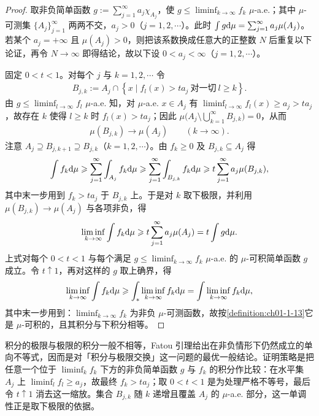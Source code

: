 \documentclass[../../main.tex]{subfiles}%
\begin{document}
\begin{proof}
取非负简单函数 $g:=\sum_{j=1}^{\infty}a_j\chi_{A_j}$，使 $g\leqslant\liminf_{k\to\infty}f_k$ $\mu$-a.e.；其中 $\mu$-可测集 $\{A_j\}_{j=1}^{\infty}$ 两两不交，$a_j>0$（$j=1,2,\cdots$）。此时 $\int g\mathrm{d}\mu=\sum_{j=1}^{\infty}a_j\mu(A_j)$。若某个 $a_j=+\infty$ 且 $\mu(A_j)>0$，则把该系数换成任意大的正整数 $N$ 后重复以下论证，再令 $N\to\infty$ 即得结论，故以下设 $0<a_j<\infty$（$j=1,2,\cdots$）。

固定 $0<t<1$。对每个 $j$ 与 $k=1,2,\cdots$ 令
\begin{align*}
B_{j,k}:=A_j\cap\left\{x\mid f_l(x)>ta_j\ \text{对一切}\ l\geqslant k\right\}.
\end{align*}
由 $g\leqslant\liminf_{l\to\infty}f_l$ $\mu$-a.e. 知，对 $\mu$-a.e. $x\in A_j$ 有 $\liminf_{l\to\infty}f_l(x)\geqslant a_j>ta_j$，故存在 $k$ 使得 $l\geqslant k$ 时 $f_l(x)>ta_j$；因此 $\mu\bigl(A_j\setminus\bigcup_{k=1}^{\infty}B_{j,k}\bigr)=0$，从而
\begin{align*}
\mu(B_{j,k})\to\mu(A_j)\qquad(k\to\infty).
\end{align*}
注意 $A_j\supseteq B_{j,k+1}\supseteq B_{j,k}$（$k=1,2,\cdots$）。由 $f_k\geqslant0$ 及 $B_{j,k}\subseteq A_j$ 得
\begin{align*}
\int f_k\mathrm{d}\mu\geqslant\sum_{j=1}^{\infty}\int_{A_j}f_k\mathrm{d}\mu\geqslant\sum_{j=1}^{\infty}\int_{B_{j,k}}f_k\mathrm{d}\mu\geqslant t\sum_{j=1}^{\infty}a_j\mu(B_{j,k}),
\end{align*}
其中末一步用到 $f_k>ta_j$ 于 $B_{j,k}$ 上。于是对 $k$ 取下极限，并利用 $\mu(B_{j,k})\to\mu(A_j)$ 与各项非负，得
\begin{align*}
\liminf_{k\to\infty}\int f_k\mathrm{d}\mu\geqslant t\sum_{j=1}^{\infty}a_j\mu(A_j)=t\int g\mathrm{d}\mu .
\end{align*}
上式对每个 $0<t<1$ 与每个满足 $g\leqslant\liminf_{k\to\infty}f_k$ $\mu$-a.e. 的 $\mu$-可积简单函数 $g$ 成立。令 $t\uparrow1$，再对这样的 $g$ 取上确界，得
\begin{align*}
\liminf_{k\to\infty}\int f_k\mathrm{d}\mu\geqslant\int_{*}\liminf_{k\to\infty}f_k\mathrm{d}\mu=\int\liminf_{k\to\infty}f_k\mathrm{d}\mu,
\end{align*}
其中末一步用到：$\liminf_{k\to\infty}f_k$ 为非负 $\mu$-可测函数，故按\cref{definition:ch01-1-13}它是 $\mu$-可积的，且其积分与下积分相等。%
\end{proof}

\begin{remark}\label{remark:ch01-thm-1-17-动机}
积分的极限与极限的积分一般不相等，Fatou 引理给出在非负情形下仍然成立的单向不等式，因而是对「积分与极限交换」这一问题的最优一般结论。证明策略是把任意一个位于 $\liminf_{k}f_k$ 下方的非负简单函数 $g$ 与 $f_k$ 的积分作比较：在水平集 $A_j$ 上 $\liminf_{l}f_l\geqslant a_j$，故最终 $f_k>ta_j$；取 $0<t<1$ 是为处理严格不等号，最后令 $t\uparrow1$ 消去这一缩放。集合 $B_{j,k}$ 随 $k$ 递增且覆盖 $A_j$ 的 $\mu$-a.e. 部分，这一单调性正是取下极限的依据。
\end{remark}
\end{document}
